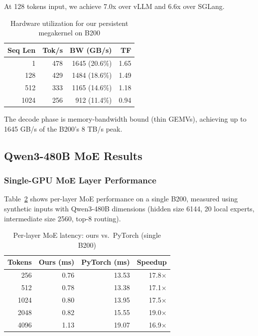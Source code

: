 \documentclass[sigplan,screen]{acmart}
\begin{document}
At 128 tokens input, we achieve 7.0x over vLLM and 6.6x over SGLang.

\begin{table}[h]
  \caption{Hardware utilization for our persistent megakernel on B200}
  \label{tab:2}
  \small
  \begin{tabular}{rrrr}
    \toprule
    Seq Len & Tok/s & BW (GB/s) & TF \\
    \midrule
    1    & 478 & 1645 (20.6\%) & 1.65 \\
    128  & 429 & 1484 (18.6\%) & 1.49 \\
    512  & 333 & 1165 (14.6\%) & 1.18 \\
    1024 & 256 & 912 (11.4\%)  & 0.94 \\
    \bottomrule
  \end{tabular}
\end{table}

The decode phase is memory-bandwidth bound (thin GEMVs), achieving up to 1645 GB/s of the B200's 8 TB/s peak.

\subsection{Qwen3-480B MoE Results}

\subsubsection{Single-GPU MoE Layer Performance}

Table~\ref{tab:moe-kernel} shows per-layer MoE performance on a single B200, measured using synthetic inputs with Qwen3-480B dimensions (hidden size 6144, 20 local experts, intermediate size 2560, top-8 routing).

\begin{table}[h]
  \caption{Per-layer MoE latency: ours vs.\ PyTorch (single B200)}
  \label{tab:moe-kernel}
  \small
  \begin{tabular}{rrrr}
    \toprule
    Tokens & Ours (ms) & PyTorch (ms) & Speedup \\
    \midrule
    256  & 0.76 & 13.53 & 17.8$\times$ \\
    512  & 0.78 & 13.38 & 17.1$\times$ \\
    1024 & 0.80 & 13.95 & 17.5$\times$ \\
    2048 & 0.82 & 15.55 & 19.0$\times$ \\
    4096 & 1.13 & 19.07 & 16.9$\times$ \\
    \bottomrule
  \end{tabular}
\end{table}
\end{document}
